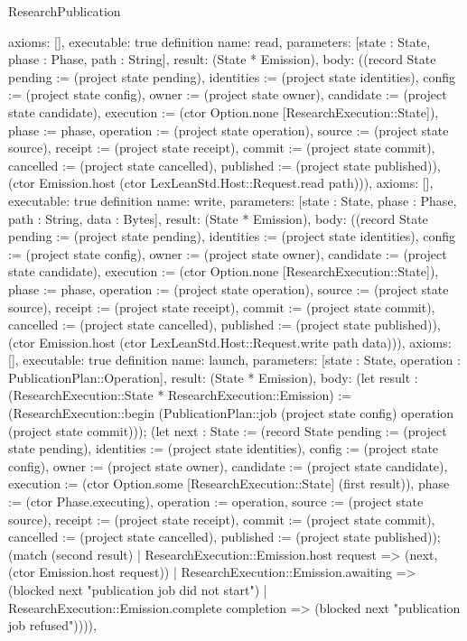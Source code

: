 \begin{lexlean}{ResearchPublication}
\begin{semanticmodule}
{ axioms: [],
 executable: true
}
definition{
 name: read,
 parameters: [state : State, phase : Phase, path : String],
 result: (State * Emission),
 body: ((record State {pending := (project state pending), identities := (project state identities), config := (project state config), owner := (project state owner), candidate := (project state candidate), execution := (ctor Option.none [ResearchExecution::State]), phase := phase, operation := (project state operation), source := (project state source), receipt := (project state receipt), commit := (project state commit), cancelled := (project state cancelled), published := (project state published)}), (ctor Emission.host (ctor LexLeanStd.Host::Request.read path))),
 axioms: [],
 executable: true
}
definition{
 name: write,
 parameters: [state : State, phase : Phase, path : String, data : Bytes],
 result: (State * Emission),
 body: ((record State {pending := (project state pending), identities := (project state identities), config := (project state config), owner := (project state owner), candidate := (project state candidate), execution := (ctor Option.none [ResearchExecution::State]), phase := phase, operation := (project state operation), source := (project state source), receipt := (project state receipt), commit := (project state commit), cancelled := (project state cancelled), published := (project state published)}), (ctor Emission.host (ctor LexLeanStd.Host::Request.write path data))),
 axioms: [],
 executable: true
}
definition{
 name: launch,
 parameters: [state : State, operation : PublicationPlan::Operation],
 result: (State * Emission),
 body: (let result : (ResearchExecution::State * ResearchExecution::Emission) := (ResearchExecution::begin (PublicationPlan::job (project state config) operation (project state commit))); (let next : State := (record State {pending := (project state pending), identities := (project state identities), config := (project state config), owner := (project state owner), candidate := (project state candidate), execution := (ctor Option.some [ResearchExecution::State] (first result)), phase := (ctor Phase.executing), operation := operation, source := (project state source), receipt := (project state receipt), commit := (project state commit), cancelled := (project state cancelled), published := (project state published)}); (match (second result) | ResearchExecution::Emission.host request => (next, (ctor Emission.host request)) | ResearchExecution::Emission.awaiting => (blocked next "publication job did not start") | ResearchExecution::Emission.complete completion => (blocked next "publication job refused")))),
}
\end{semanticmodule}
\end{lexlean}
